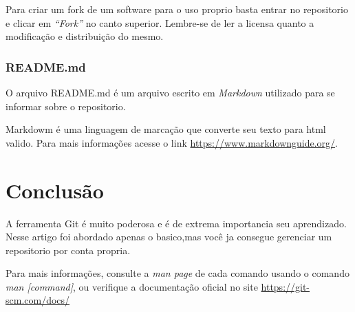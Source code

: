 \documentclass[]{article}
\begin{document}
Para criar um fork de um software para o uso proprio basta entrar no repositorio e clicar em \textit{``Fork''} no canto superior.
Lembre-se de ler a licensa quanto a modificação e distribuição do mesmo.

\subsubsection*{README.md}

O arquivo README.md é um arquivo escrito em \textit{Markdown} utilizado para se informar sobre o repositorio.

Markdowm é uma linguagem de marcação que converte seu texto para html valido. 
Para mais informações acesse o link \url{https://www.markdownguide.org/}.
\section{Conclusão}
A ferramenta Git é muito poderosa e é de extrema importancia seu aprendizado.
Nesse artigo foi abordado apenas o basico,mas você ja consegue gerenciar um repositorio por conta propria.

Para mais informações, consulte  a \textit{man page} de cada comando usando o comando \textit{man [command]}, 
ou  verifique a documentação oficial no site \url{https://git-scm.com/docs/}















\printbibliography 
\end{document}
